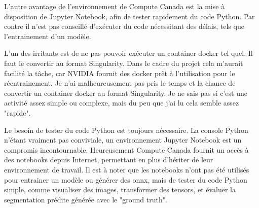 \par L'autre avantage de l'environnement de Compute Canada est la mise à disposition de Jupyter Notebook, afin de tester rapidement du code Python. Par contre il n'est pas conseillé d'exécuter du code nécessitant des délais, tels que l'entrainement d'un modèle. 
\par L'un des irritants est de ne pas pouvoir exécuter un container docker tel quel. Il faut le convertir au format Singularity. Dans le cadre du projet cela m'aurait facilité la tâche, car NVIDIA fournit des docker prêt à l'utilisation pour le réentrainement. Je n'ai malheureusement pas pris le temps et la chance de convertir un container docker au format Singularity. Je ne sais pas si c'est une activité assez simple ou complexe, mais du peu que j'ai lu cela semble assez "rapide".
\par Le besoin de tester du code Python est toujours nécessaire. La console Python n'étant vraiment pas conviviale, un environnement Jupyter Notebook est un compromis incontournable. Heureusement Compute Canada fournit un accès à des notebooks depuis Internet, permettant en plus d'hériter de leur environnement de travail. Il est à noter que les notebooks n'ont pas été utilisés pour entrainer un modèle ou générer des onnx, mais de tester du code Python simple, comme visualiser des images, transformer des tensors, et évaluer la segmentation prédite générée avec le "ground truth". 
